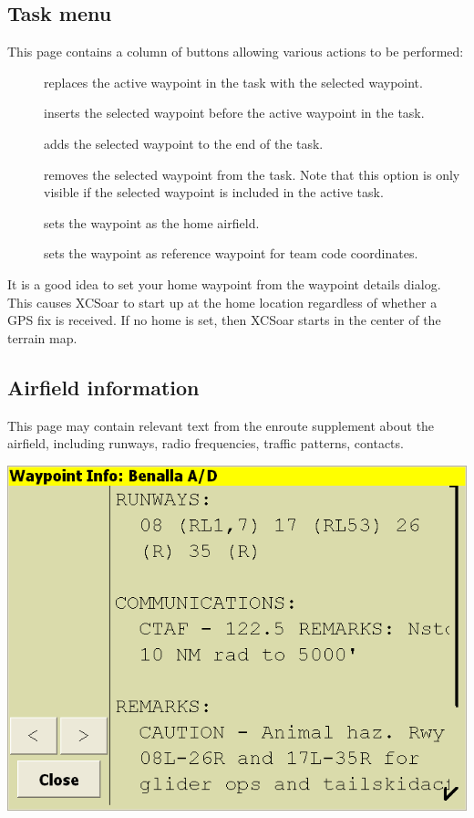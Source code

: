 \subsection*{Task menu}  
This page contains a column of buttons allowing various actions to be performed:
\begin{description}
\item[] replaces the active waypoint in the task with the selected waypoint.
\item[] inserts the selected waypoint before the active waypoint in
  the task.
\item[] adds the selected waypoint to the end of the task.
\item[] removes the selected waypoint from the task.  Note that this option is only visible if the selected waypoint is included in the active task.
\item[] sets the waypoint as the home airfield.
\item[] sets the waypoint as reference waypoint for
  team code coordinates.


\end{description}

It is a good idea to set your home waypoint from the waypoint details
dialog. This causes XCSoar to start up at the home location regardless
of whether a GPS fix is received.  If no home is set, then XCSoar
starts in the center of the terrain map.

\subsection*{Airfield information}
This page may contain relevant text from the enroute supplement about
the airfield, including runways, radio frequencies, traffic patterns,
contacts.
\begin{center}
\includegraphics[angle=0,width=0.8\linewidth,keepaspectratio='true']{figures/dialog-waypointdetails1.png}
\end{center}

